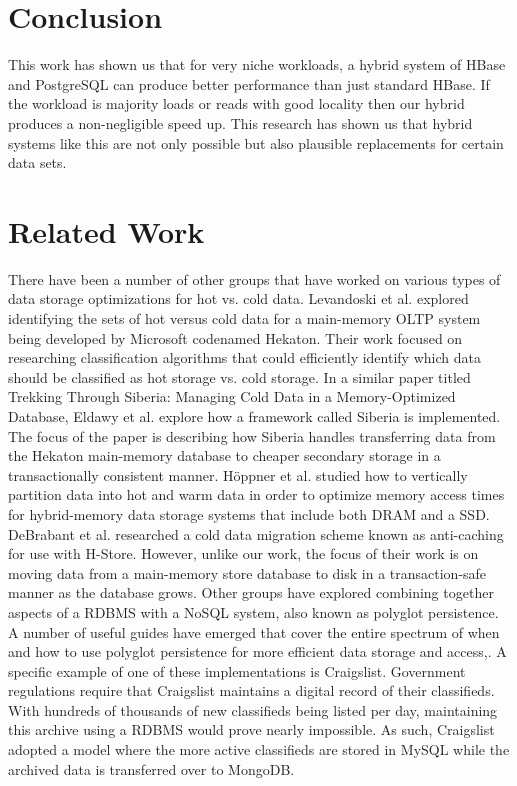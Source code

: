 \documentclass[12pt]{article}
\begin{document}
\section{Conclusion}
This work has shown us that for very niche workloads, a hybrid system of HBase and PostgreSQL can produce better performance than just standard HBase. If the workload is majority loads or reads with good locality then our hybrid produces a non-negligible speed up. This research has shown us that hybrid systems like this are not only possible but also plausible replacements for certain data sets. 

\section{Related Work}
There have been a number of other groups that have worked on various types of data storage optimizations for hot vs. cold data. Levandoski et al. explored identifying the sets of hot versus cold data for a main-memory OLTP system being developed by Microsoft codenamed Hekaton. Their work focused on researching classification algorithms that could efficiently identify which data should be classified as hot storage vs. cold storage\cite{1}. In a similar paper titled Trekking Through Siberia: Managing Cold Data in a Memory-Optimized Database, Eldawy et al. explore how a framework called Siberia is implemented. The focus of the paper is describing how Siberia handles transferring data from the Hekaton main-memory database to cheaper secondary storage in a transactionally consistent manner\cite{2}. Höppner et al. studied how to vertically partition data into hot and warm data in order to optimize memory access times for hybrid-memory data storage systems that include both DRAM and a SSD\cite{3}. DeBrabant et al. researched a cold data migration scheme known as anti-caching for use with H-Store\cite{4}. However, unlike our work, the focus of their work is on moving data from a main-memory store database to disk in a transaction-safe manner as the database grows.
Other groups have explored combining together aspects of a RDBMS with a NoSQL system, also known as polyglot persistence. A number of useful guides have emerged that cover the entire spectrum of when and how to use polyglot persistence for more efficient data storage and access\cite{5},\cite{6}. A specific example of one of these implementations is Craigslist. Government regulations require that Craigslist maintains a digital record of their classifieds. With hundreds of thousands of new classifieds being listed per day, maintaining this archive using a RDBMS would prove nearly impossible. As such, Craigslist adopted a model where the more active classifieds are stored in MySQL while the archived data is transferred over to MongoDB\cite{7}. 
\end{document}
